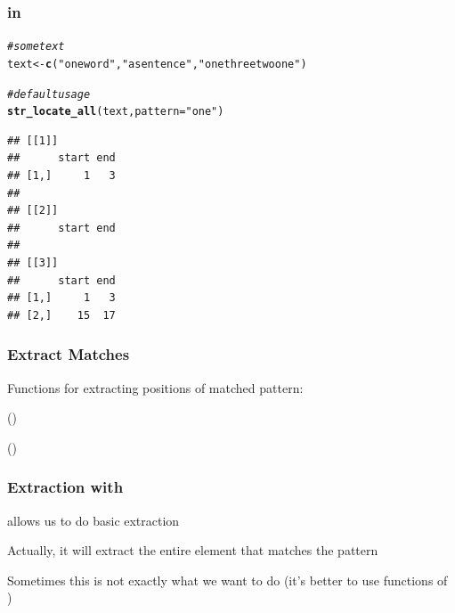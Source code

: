 \documentclass[12pt]{beamer}\usepackage[]{graphicx}\usepackage[]{color}
\makeatletter
\newcommand{\hlstr}[1]{\textcolor[rgb]{0.192,0.494,0.8}{#1}}%
\newcommand{\hlcom}[1]{\textcolor[rgb]{0.678,0.584,0.686}{\textit{#1}}}%
\newcommand{\hlstd}[1]{\textcolor[rgb]{0.345,0.345,0.345}{#1}}%
\newcommand{\hlkwb}[1]{\textcolor[rgb]{0.69,0.353,0.396}{#1}}%
\newcommand{\hlkwc}[1]{\textcolor[rgb]{0.333,0.667,0.333}{#1}}%
\newcommand{\hlkwd}[1]{\textcolor[rgb]{0.737,0.353,0.396}{\textbf{#1}}}%
\newenvironment{kframe}{%
 \def\at@end@of@kframe{}%
 \ifinner\ifhmode%
  \def\at@end@of@kframe{\end{minipage}}%
  \begin{minipage}{\columnwidth}%
 \fi\fi%
 \def\FrameCommand##1{\hskip\@totalleftmargin \hskip-\fboxsep
 \colorbox{shadecolor}{##1}\hskip-\fboxsep
     \hskip-\linewidth \hskip-\@totalleftmargin \hskip\columnwidth}%
 \MakeFramed {\advance\hsize-\width
   \@totalleftmargin\z@ \linewidth\hsize
   \@setminipage}}%
 {\par\unskip\endMakeFramed%
 \at@end@of@kframe}
\newenvironment{knitrout}{}{} %
\makeatother
\begin{document}
\begin{frame}[fragile]
\frametitle{ in }

\begin{knitrout}\footnotesize
{}\color{fgcolor}\begin{kframe}
\begin{alltt}
\hlcom{# some text}
\hlstd{text} \hlkwb{<-} \hlkwd{c}\hlstd{(}\hlstr{"one word"}\hlstd{,} \hlstr{"a sentence"}\hlstd{,} \hlstr{"one three two one"}\hlstd{)}

\hlcom{# default usage}
\hlkwd{str_locate_all}\hlstd{(text,} \hlkwc{pattern} \hlstd{=} \hlstr{"one"}\hlstd{)}
\end{alltt}
\begin{verbatim}
## [[1]]
##      start end
## [1,]     1   3
## 
## [[2]]
##      start end
## 
## [[3]]
##      start end
## [1,]     1   3
## [2,]    15  17
\end{verbatim}
\end{kframe}
\end{knitrout}

\end{frame}


\begin{frame}
\begin{center}
\Huge{}
\end{center}
\end{frame}


\begin{frame}
\frametitle{Extract Matches}

Functions for extracting positions of matched pattern: 
\bbi
  \item {}
  \item {} ()
  \item {} ()
\ei

\end{frame}


\begin{frame}[fragile]
\frametitle{Extraction with }

\bi
  \item {\hilit {}} allows us to do basic extraction
  \item Actually, it will extract the entire element that matches the pattern
  \item Sometimes this is not exactly what we want to do (it's better to use functions of )
\ei

\end{frame}
\end{document}
